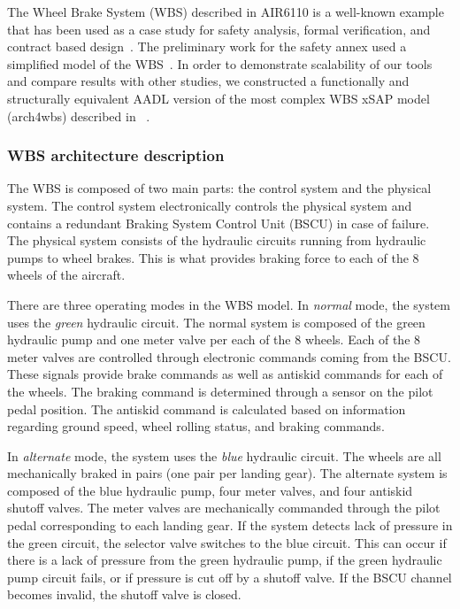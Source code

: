 The Wheel Brake System (WBS) described in AIR6110 is a well-known example that has been used as a case study for safety analysis, formal verification, and contract based design~\cite{DBLP:conf/cav/BozzanoCPJKPRT15, 10.1007/978-3-319-11936-6-7, CAV2015:BoCiGrMa, Joshi05:SafeComp}. The preliminary work for the safety annex used a simplified model of the WBS~\cite{Stewart17:IMBSA}. In order to demonstrate scalability of our tools and compare results with other studies, we constructed a functionally and structurally equivalent AADL version of %
the most complex WBS xSAP model (arch4wbs) described in %
~\cite{DBLP:conf/cav/BozzanoCPJKPRT15}.  %

\subsubsection{WBS architecture description}
The WBS is composed of two main parts: the control system and the physical system. The control system electronically controls the physical system and contains a redundant Braking System Control Unit (BSCU) in case of failure. The physical system consists of the hydraulic circuits running from hydraulic pumps to wheel brakes. This is what provides braking force to each of the 8 wheels of the aircraft.

There are three operating modes in the WBS model. In \textit{normal} mode, the system uses the \textit{green} hydraulic circuit. The normal system is composed of the green hydraulic pump and one meter valve per each of the 8 wheels. Each of the 8 meter valves are controlled through electronic commands coming from the BSCU. These signals provide brake commands as well as antiskid commands for each of the wheels. The braking command is determined through a sensor on the pilot pedal position. The antiskid command is calculated based on information regarding ground speed, wheel rolling status, and braking commands.

In \textit{alternate} mode, the system uses the \textit{blue} hydraulic circuit.  The wheels are all mechanically braked in pairs (one pair per landing gear). The alternate system is composed of the blue hydraulic pump, four meter valves, and four antiskid shutoff valves. The meter valves are mechanically commanded through the pilot pedal corresponding to each landing gear. If the system detects lack of pressure in the green circuit, the selector valve switches to the blue circuit. This can occur if there is a lack of pressure from the green hydraulic pump, if the green hydraulic pump circuit fails, or if pressure is cut off by a shutoff valve. If the BSCU channel becomes invalid, the shutoff valve is closed.

